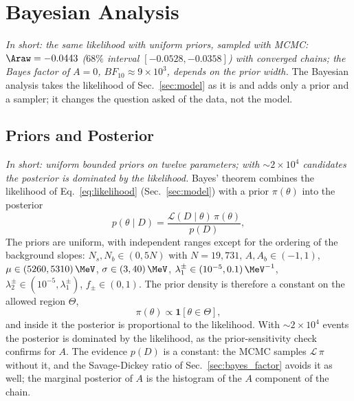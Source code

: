 \section{Bayesian Analysis}
\label{sec:bayesian}
\label{app:ext_bayes}
\emph{In short: the same likelihood with uniform priors, sampled with MCMC: $\Araw=-0.0443$ ($68\%$ interval $[-0.0528,-0.0358]$) with converged chains; the Bayes factor of $A=0$, $BF_{10}\approx9\times10^3$, depends on the prior width.}
The Bayesian analysis takes the likelihood of Sec.~\ref{sec:model} as it is and adds only a prior and a sampler; it changes the question asked of the data, not the model.
\subsection{Priors and Posterior}
\label{sec:bayes_prior}
\emph{In short: uniform bounded priors on twelve parameters; with $\sim2\times10^4$ candidates the posterior is dominated by the likelihood.}
Bayes' theorem combines the likelihood of Eq.~\eqref{eq:likelihood} (Sec.~\ref{sec:model}) with a prior $\pi(\theta)$ into the posterior
\begin{equation}
p(\theta\mid D)=\frac{\mathcal{L}(D\mid\theta)\,\pi(\theta)}{p(D)},
\label{eq:bayes}
\end{equation}
The priors are uniform, with independent ranges except for the ordering of the background slopes: $N_s,N_b\in(0,5N)$ with $N=19{,}731$, $A,A_b\in(-1,1)$, $\mu\in(5260,5310)\,\MeV$, $\sigma\in(3,40)\,\MeV$, $\lambda_1^{\pm}\in(10^{-5},0.1)\,\MeV^{-1}$, $\lambda_2^{\pm}\in(10^{-5},\lambda_1^{\pm})$, $f_{\pm}\in(0,1)$. The prior density is therefore a constant on the allowed region $\Theta$,
\begin{equation}
\pi(\theta)\propto\mathbf{1}\left[\theta\in\Theta\right],
\label{eq:prior}
\end{equation}
and inside it the posterior is proportional to the likelihood. With $\sim$$2\times10^4$ events the posterior is dominated by the likelihood, as the prior-sensitivity check confirms for $A$. The evidence $p(D)$ is a constant: the MCMC samples $\mathcal{L}\,\pi$ without it, and the Savage-Dickey ratio of Sec.~\ref{sec:bayes_factor} avoids it as well; the marginal posterior of $A$ is the histogram of the $A$ component of the chain.
